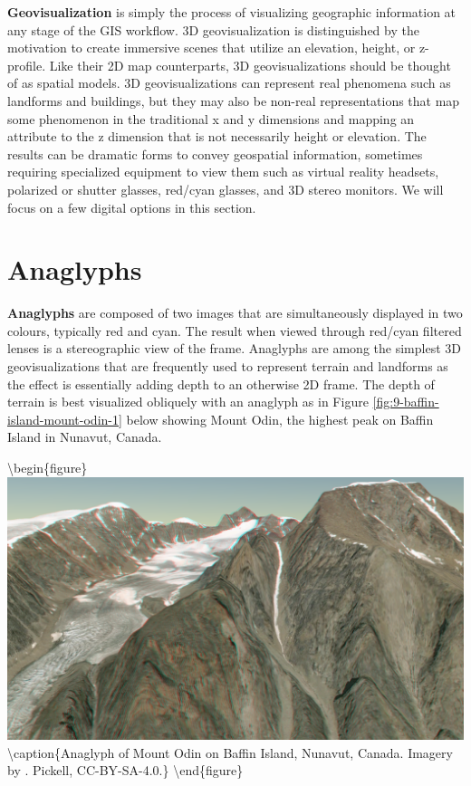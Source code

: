 \documentclass[
]{book}
\begin{document}
\textbf{Geovisualization} is simply the process of visualizing geographic information at any stage of the GIS workflow. 3D geovisualization is distinguished by the motivation to create immersive scenes that utilize an elevation, height, or z-profile. Like their 2D map counterparts, 3D geovisualizations should be thought of as spatial models. 3D geovisualizations can represent real phenomena such as landforms and buildings, but they may also be non-real representations that map some phenomenon in the traditional x and y dimensions and mapping an attribute to the z dimension that is not necessarily height or elevation. The results can be dramatic forms to convey geospatial information, sometimes requiring specialized equipment to view them such as virtual reality headsets, polarized or shutter glasses, red/cyan glasses, and 3D stereo monitors. We will focus on a few digital options in this section.

\hypertarget{anaglyphs}{%
\section{Anaglyphs}\label{anaglyphs}}

\textbf{Anaglyphs} are composed of two images that are simultaneously displayed in two colours, typically red and cyan. The result when viewed through red/cyan filtered lenses is a stereographic view of the frame. Anaglyphs are among the simplest 3D geovisualizations that are frequently used to represent terrain and landforms as the effect is essentially adding depth to an otherwise 2D frame. The depth of terrain is best visualized obliquely with an anaglyph as in Figure \ref{fig:9-baffin-island-mount-odin-1} below showing Mount Odin, the highest peak on Baffin Island in Nunavut, Canada.

\textbackslash begin\{figure\}
\includegraphics[width=0.75\linewidth]{images/09-baffin-island-mount-odin-1} \textbackslash caption\{Anaglyph of Mount Odin on Baffin Island, Nunavut, Canada. Imagery by \citet{maxar_precision3d_nodate}. Pickell, CC-BY-SA-4.0.\}\label{fig:9-baffin-island-mount-odin-1}
\textbackslash end\{figure\}
\end{document}
